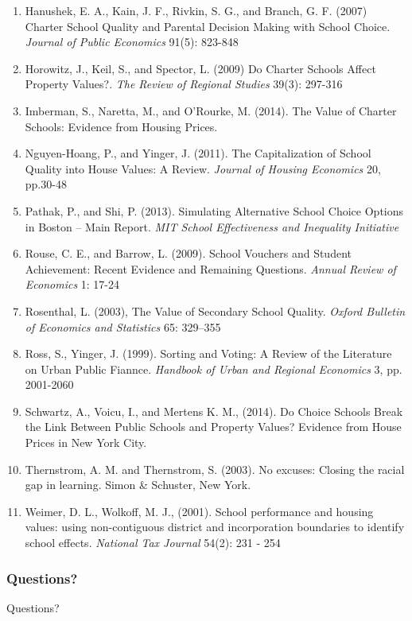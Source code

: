 \documentclass{beamer}
\begin{document}
\begin{frame}
\begin{enumerate}
	\item Hanushek, E. A., Kain, J. F., Rivkin, S. G., and Branch, G. F. (2007) Charter School Quality and Parental Decision Making with School Choice. \textit{Journal of Public Economics} 91(5): 823-848
	
	\item Horowitz, J., Keil, S., and Spector, L. (2009) Do Charter Schools Affect Property Values?. \textit{The Review of Regional Studies} 39(3): 297-316
	
	\item Imberman, S., Naretta, M., and O'Rourke, M. (2014). The Value of Charter Schools: Evidence from Housing Prices.
	
	\item Nguyen-Hoang, P., and Yinger, J. (2011). The Capitalization of School Quality into House Values: A Review. \textit{Journal of Housing Economics} 20, pp.30-48
	
	\item Pathak, P., and Shi, P. (2013). Simulating Alternative School Choice Options in Boston -- Main Report. \textit{MIT School Effectiveness and Inequality Initiative}
	
	\item Rouse, C. E., and Barrow, L. (2009). School Vouchers and Student Achievement: Recent Evidence and Remaining Questions. \textit{Annual Review of Economics} 1: 17-24
	
	\item Rosenthal, L. (2003), The Value of Secondary School Quality. \textit{Oxford Bulletin of Economics and Statistics} 65: 329–355
	
	\item Ross, S., Yinger, J. (1999). Sorting and Voting: A Review of the Literature on Urban Public Fiannce. \textit{Handbook of Urban and Regional Economics} 3, pp. 2001-2060
	
	\item Schwartz, A., Voicu, I., and Mertens K. M., (2014). Do Choice Schools Break the Link Between Public Schools and Property Values? Evidence from House Prices in New York City.
	
	\item Thernstrom, A. M. and Thernstrom, S. (2003). No excuses: Closing the racial gap in learning. Simon \& Schuster, New York.
	
	\item Weimer, D. L., Wolkoff, M. J., (2001). School performance and housing values: using non-contiguous district and incorporation boundaries to identify school effects. \textit{National Tax Journal} 54(2): 231 - 254
  
  \end{enumerate}
\end{frame}

\begin{frame} 
\frametitle{Questions?}
\centerline{{\Huge Questions?}}
\end{frame}
\end{document}
